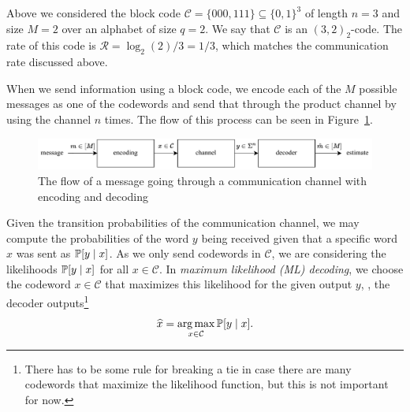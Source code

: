 \documentclass[../main.tex]{subfiles}
\begin{document}
\begin{example}
Above we considered the block code $\mathcal{C} = \{000, 111\} \subseteq \{0, 1\}^3$ of length $n = 3$ and size $M = 2$ over an alphabet of size $q = 2$. We say that $\mathcal{C}$ is an $(3, 2)_2$-code. The rate of this code is $\mathcal{R} = \log_2(2) / 3 = 1 / 3$, which matches the communication rate discussed above.
\end{example}

When we send information using a block code, we encode each of the $M$ possible messages as one of the codewords and send that through the product channel by using the channel $n$ times. The flow of this process can be seen in Figure~\ref{fig:channel_coding}.

\begin{figure}
    \centering
    \includegraphics[width=.9\textwidth]{images/channel_coding_diagram.pdf}
    \caption{The flow of a message going through a communication channel with encoding and decoding}
    \label{fig:channel_coding}
\end{figure}

Given the transition probabilities of the communication channel, we may compute the probabilities of the word $y$ being received given that a specific word $x$ was sent as $\P[y \mid x]$. As we only send codewords in $\mathcal{C}$, we are considering the likelihoods $\P[y \mid x]$ for all $x \in \mathcal{C}$. In \emph{maximum likelihood (ML) decoding}, we choose the codeword $x \in \mathcal{C}$ that maximizes this likelihood for the given output $y$, \ie, the decoder outputs\footnote{There has to be some rule for breaking a tie in case there are many codewords that maximize the likelihood function, but this is not important for now.}
\begin{equation*}
    \hat{x} = \argmax_{x \in \mathcal{C}} \P[y \mid x].
\end{equation*}
\end{document}
